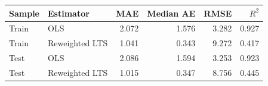 \begin{tabular}{llrrrr}
\toprule
Sample & Estimator & MAE & Median AE & RMSE & $R^2$ \\
\midrule
Train & OLS & 2.072 & 1.576 & 3.282 & 0.927 \\
Train & Reweighted LTS & 1.041 & 0.343 & 9.272 & 0.417 \\
Test & OLS & 2.086 & 1.594 & 3.253 & 0.923 \\
Test & Reweighted LTS & 1.015 & 0.347 & 8.756 & 0.445 \\
\bottomrule
\end{tabular}
